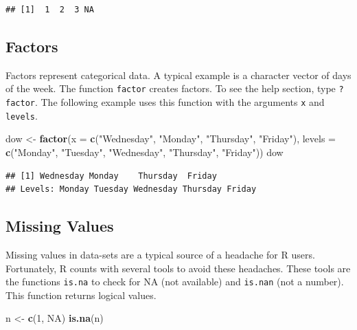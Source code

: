 \documentclass[12pt,graybox,envcountchap,sectrefs]{krantz}
\makeatletter
\newenvironment{Shaded}{\begin{snugshade}}{\end{snugshade}}
\newcommand{\KeywordTok}[1]{\textcolor[rgb]{0.13,0.29,0.53}{\textbf{#1}}}
\newcommand{\DataTypeTok}[1]{\textcolor[rgb]{0.13,0.29,0.53}{#1}}
\newcommand{\DecValTok}[1]{\textcolor[rgb]{0.00,0.00,0.81}{#1}}
\newcommand{\StringTok}[1]{\textcolor[rgb]{0.31,0.60,0.02}{#1}}
\newcommand{\OtherTok}[1]{\textcolor[rgb]{0.56,0.35,0.01}{#1}}
\newcommand{\NormalTok}[1]{#1}
\newenvironment{kframe}{%
\medskip{}
\setlength{\fboxsep}{.8em}
 \def\at@end@of@kframe{}%
 \ifinner\ifhmode%
  \def\at@end@of@kframe{\end{minipage}}%
  \begin{minipage}{\columnwidth}%
 \fi\fi%
 \def\FrameCommand##1{\hskip\@totalleftmargin \hskip-\fboxsep
 \colorbox{shadecolor}{##1}\hskip-\fboxsep
     \hskip-\linewidth \hskip-\@totalleftmargin \hskip\columnwidth}%
 \MakeFramed {\advance\hsize-\width
   \@totalleftmargin\z@ \linewidth\hsize
   \@setminipage}}%
 {\par\unskip\endMakeFramed%
 \at@end@of@kframe}
\renewenvironment{Shaded}{\begin{kframe}}{\end{kframe}}
\theoremstyle{definition}
\theoremstyle{definition}
\theoremstyle{definition}
\theoremstyle{remark}
\makeatother
\begin{document}
\begin{verbatim}
## [1]  1  2  3 NA
\end{verbatim}

\subsection{Factors}\label{factors}

Factors represent categorical data. A typical example is a character
vector of days of the week. The function \texttt{factor} creates
factors. To see the help section, type \texttt{?factor}. The following
example uses this function with the arguments \texttt{x} and
\texttt{levels}.

\begin{Shaded}
\begin{Highlighting}[]
\NormalTok{dow <-}\StringTok{ }\KeywordTok{factor}\NormalTok{(}\DataTypeTok{x =} \KeywordTok{c}\NormalTok{(}\StringTok{"Wednesday"}\NormalTok{, }\StringTok{"Monday"}\NormalTok{, }\StringTok{"Thursday"}\NormalTok{, }\StringTok{"Friday"}\NormalTok{),}
              \DataTypeTok{levels =}  \KeywordTok{c}\NormalTok{(}\StringTok{"Monday"}\NormalTok{, }\StringTok{"Tuesday"}\NormalTok{, }\StringTok{"Wednesday"}\NormalTok{, }\StringTok{"Thursday"}\NormalTok{,}
                          \StringTok{"Friday"}\NormalTok{))}
\NormalTok{dow}
\end{Highlighting}
\end{Shaded}

\begin{verbatim}
## [1] Wednesday Monday    Thursday  Friday   
## Levels: Monday Tuesday Wednesday Thursday Friday
\end{verbatim}

\subsection{Missing Values}\label{missing-values}

Missing values in data-sets are a typical source of a headache for R
users. Fortunately, R counts with several tools to avoid these
headaches. These tools are the functions \texttt{is.na} to check for NA
(not available) and \texttt{is.nan} (not a number). This function
returns logical values.

\begin{Shaded}
\begin{Highlighting}[]
\NormalTok{n <-}\StringTok{ }\KeywordTok{c}\NormalTok{(}\DecValTok{1}\NormalTok{, }\OtherTok{NA}\NormalTok{)}
\KeywordTok{is.na}\NormalTok{(n)}
\end{Highlighting}
\end{Shaded}
\end{document}
